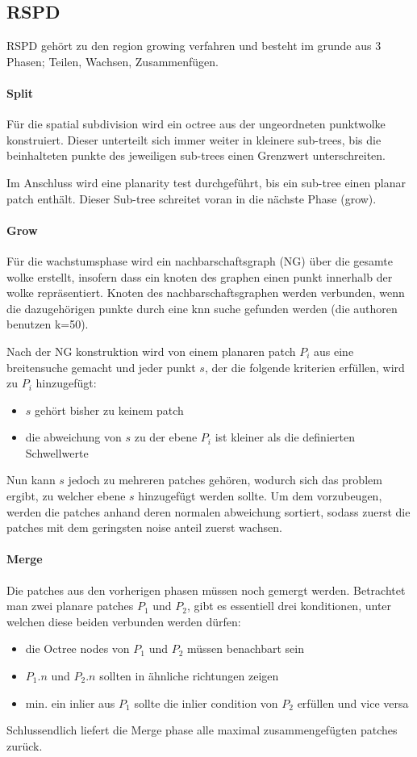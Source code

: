 \documentclass[main.tex]{subfiles}
\begin{document}
\subsection{RSPD}
RSPD gehört zu den region growing verfahren und besteht im grunde aus 3 Phasen; Teilen, Wachsen, Zusammenfügen.

\paragraph*{Split}
Für die spatial subdivision wird ein octree aus der ungeordneten punktwolke konstruiert. Dieser unterteilt sich immer weiter in kleinere sub-trees,
bis die beinhalteten punkte des jeweiligen sub-trees einen Grenzwert unterschreiten.

Im Anschluss wird eine planarity test durchgeführt, bis ein sub-tree einen planar patch enthält. Dieser Sub-tree schreitet voran in die nächste Phase (grow).

\paragraph*{Grow}
Für die wachstumsphase wird ein nachbarschaftsgraph (NG) über die gesamte wolke erstellt, insofern dass ein knoten des graphen einen punkt innerhalb der wolke repräsentiert. Knoten des
nachbarschaftsgraphen werden verbunden, wenn die dazugehörigen punkte durch eine knn suche gefunden werden (die authoren benutzen k=50).

Nach der NG konstruktion wird von einem planaren patch $P_i$ aus eine breitensuche gemacht und jeder punkt $s$, der die folgende kriterien erfüllen, wird zu $P_i$ hinzugefügt:
\begin{itemize}
    \item $s$ gehört bisher zu keinem patch
    \item die abweichung von $s$ zu der ebene $P_i$ ist kleiner als die definierten Schwellwerte
\end{itemize}

Nun kann $s$ jedoch zu mehreren patches gehören, wodurch sich das problem ergibt, zu welcher ebene $s$ hinzugefügt werden sollte.
Um dem vorzubeugen, werden die patches anhand deren normalen abweichung sortiert, sodass zuerst die patches mit dem geringsten noise anteil zuerst wachsen.

\paragraph*{Merge}
Die patches aus den vorherigen phasen müssen noch gemergt werden. Betrachtet man zwei planare patches $P_1$ und $P_2$, gibt es essentiell drei konditionen, unter welchen diese beiden verbunden werden dürfen:
\begin{itemize}
    \item die Octree nodes von $P_1$ und $P_2$ müssen benachbart sein
    \item $P_1.n$ und $P_2.n$ sollten in ähnliche richtungen zeigen
    \item min. ein inlier aus $P_1$ sollte die inlier condition von $P_2$ erfüllen und vice versa
\end{itemize}
Schlussendlich liefert die Merge phase alle maximal zusammengefügten patches zurück. 
\end{document}
